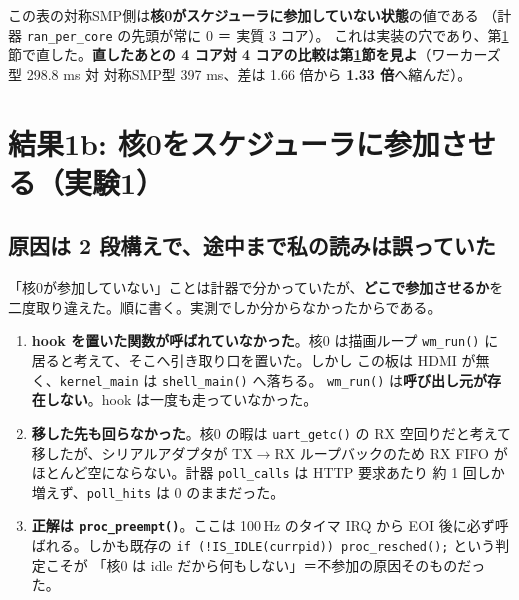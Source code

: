 \documentclass[a4paper,11pt]{ltjsarticle}
\begin{document}
\begin{center}
\end{center}

この表の対称SMP側は\textbf{核0がスケジューラに参加していない状態}の値である
（計器 \texttt{ran\_per\_core} の先頭が常に 0 ＝ 実質 3 コア）。
これは実装の穴であり、第\ref{sec:exp1}節で直した。\textbf{直したあとの
4 コア対 4 コアの比較は第\ref{sec:exp1}節を見よ}（ワーカーズ型 298.8 ms 対
対称SMP型 397 ms、差は 1.66 倍から \textbf{1.33 倍}へ縮んだ）。

\section{結果1b: 核0をスケジューラに参加させる（実験1）}\label{sec:exp1}

\subsection{原因は 2 段構えで、途中まで私の読みは誤っていた}
「核0が参加していない」ことは計器で分かっていたが、\textbf{どこで参加させるか}を
二度取り違えた。順に書く。実測でしか分からなかったからである。

\begin{enumerate}
\item \textbf{hook を置いた関数が呼ばれていなかった}。核0 は描画ループ
      \texttt{wm\_run()} に居ると考えて、そこへ引き取り口を置いた。しかし
      この板は HDMI が無く、\texttt{kernel\_main} は \texttt{shell\_main()} へ落ちる。
      \texttt{wm\_run()} は\textbf{呼び出し元が存在しない}。hook は一度も走っていなかった。
\item \textbf{移した先も回らなかった}。核0 の暇は \texttt{uart\_getc()} の
      RX 空回りだと考えて移したが、シリアルアダプタが TX$\to$RX ループバックのため
      RX FIFO がほとんど空にならない。計器 \texttt{poll\_calls} は HTTP 要求あたり
      約 1 回しか増えず、\texttt{poll\_hits} は 0 のままだった。
\item \textbf{正解は \texttt{proc\_preempt()}}。ここは 100\,Hz のタイマ IRQ から
      EOI 後に必ず呼ばれる。しかも既存の
      \texttt{if (!IS\_IDLE(currpid)) proc\_resched();} という判定こそが
      「核0 は idle だから何もしない」＝不参加の原因そのものだった。
\end{enumerate}
\end{document}
